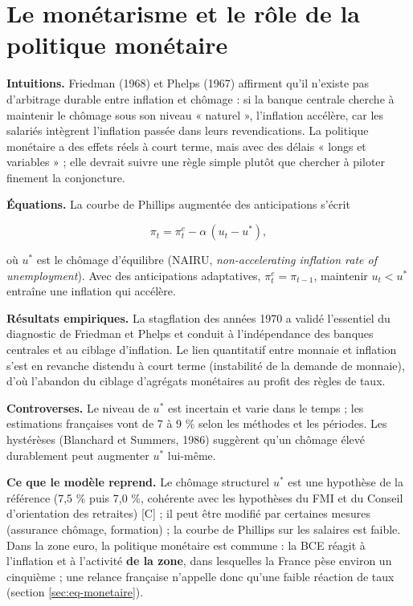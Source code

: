 \documentclass[
  11pt,
  11pt,
  a4paper,
  openany]{book}
\begin{document}
\hypertarget{sec:monetarisme}{%
\section{Le monétarisme et le rôle de la politique
monétaire}\label{sec:monetarisme}}

\textbf{Intuitions.} Friedman (1968) et Phelps (1967) affirment qu'il
n'existe pas d'arbitrage durable entre inflation et chômage : si la
banque centrale cherche à maintenir le chômage sous son niveau « naturel
», l'inflation accélère, car les salariés intègrent l'inflation passée
dans leurs revendications. La politique monétaire a des effets réels à
court terme, mais avec des délais « longs et variables » ; elle devrait
suivre une règle simple plutôt que chercher à piloter finement la
conjoncture.

\textbf{Équations.} La courbe de Phillips augmentée des anticipations
s'écrit

\[\pi_t = \pi^e_t - \alpha\,(u_t - u^*),\]

où \(u^*\) est le chômage d'équilibre (NAIRU, \emph{non-accelerating
inflation rate of unemployment}). Avec des anticipations adaptatives,
\(\pi^e_t = \pi_{t-1}\), maintenir \(u_t < u^*\) entraîne une inflation
qui accélère.

\textbf{Résultats empiriques.} La stagflation des années 1970 a validé
l'essentiel du diagnostic de Friedman et Phelps et conduit à
l'indépendance des banques centrales et au ciblage d'inflation. Le lien
quantitatif entre monnaie et inflation s'est en revanche distendu à
court terme (instabilité de la demande de monnaie), d'où l'abandon du
ciblage d'agrégats monétaires au profit des règles de taux.

\textbf{Controverses.} Le niveau de \(u^*\) est incertain et varie dans
le temps ; les estimations françaises vont de 7 à 9 \% selon les
méthodes et les périodes. Les hystérèses (Blanchard et Summers, 1986)
suggèrent qu'un chômage élevé durablement peut augmenter \(u^*\)
lui-même.

\textbf{Ce que le modèle reprend.} Le chômage structurel \(u^*\) est une
hypothèse de la référence (7,5 \% puis 7,0 \%, cohérente avec les
hypothèses du FMI et du Conseil d'orientation des retraites) {[}C{]} ;
il peut être modifié par certaines mesures (assurance chômage,
formation) ; la courbe de Phillips sur les salaires est faible. Dans la
zone euro, la politique monétaire est commune : la BCE réagit à
l'inflation et à l'activité \textbf{de la zone}, dans lesquelles la
France pèse environ un cinquième ; une relance française n'appelle donc
qu'une faible réaction de taux (section \ref{sec:eq-monetaire}).
\end{document}
